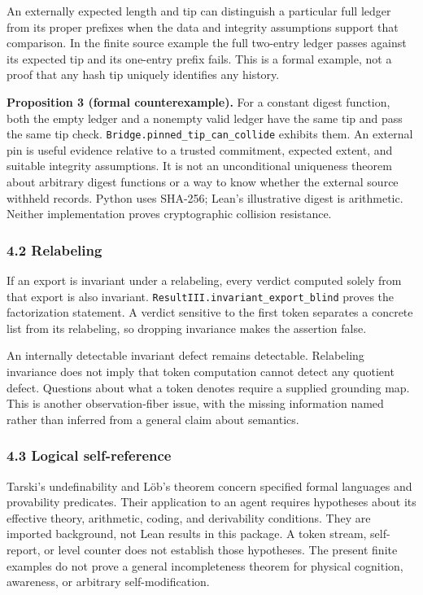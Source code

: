\documentclass[
  10pt,
]{article}
\begin{document}
An externally expected length and tip can distinguish a particular full ledger from its proper prefixes when the data and integrity assumptions support that comparison. In the finite source example the full two-entry ledger passes against its expected tip and its one-entry prefix fails. This is a formal example, not a proof that any hash tip uniquely identifies any history.

\textbf{Proposition 3 (formal counterexample).} For a constant digest function, both the empty ledger and a nonempty valid ledger have the same tip and pass the same tip check. \texttt{Bridge.pinned\_tip\_can\_collide} exhibits them. An external pin is useful evidence relative to a trusted commitment, expected extent, and suitable integrity assumptions. It is not an unconditional uniqueness theorem about arbitrary digest functions or a way to know whether the external source withheld records. Python uses SHA-256; Lean's illustrative digest is arithmetic. Neither implementation proves cryptographic collision resistance.

\subsubsection{4.2 Relabeling}\label{relabeling}

If an export is invariant under a relabeling, every verdict computed solely from that export is also invariant. \texttt{ResultIII.invariant\_export\_blind} proves the factorization statement. A verdict sensitive to the first token separates a concrete list from its relabeling, so dropping invariance makes the assertion false.

An internally detectable invariant defect remains detectable. Relabeling invariance does not imply that token computation cannot detect any quotient defect. Questions about what a token denotes require a supplied grounding map. This is another observation-fiber issue, with the missing information named rather than inferred from a general claim about semantics.

\subsubsection{4.3 Logical self-reference}\label{logical-self-reference}

Tarski's undefinability and Löb's theorem concern specified formal languages and provability predicates. Their application to an agent requires hypotheses about its effective theory, arithmetic, coding, and derivability conditions. They are imported background, not Lean results in this package. A token stream, self-report, or level counter does not establish those hypotheses. The present finite examples do not prove a general incompleteness theorem for physical cognition, awareness, or arbitrary self-modification.
\end{document}
